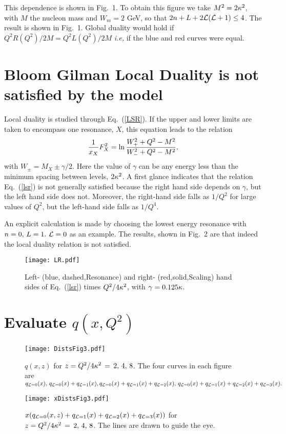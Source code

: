 \documentclass[aps,prd,amsmath,longbibliography]{revtex4-1}
\newcommand{\eq}[1]{Eq.~(\ref{#1})}
\def\bea{\begin{eqnarray}}
\def\eea{\end{eqnarray}}\def\a{\alpha}\newcommand{\bfk}{{\bf k}}\newcommand{\bfq}{{\bf q}}
\def\g{\gamma}\def\m{\mu}\def\t{\tau}\def\ve{\varepsilon}\def\l{\lambda}\def\s{\sigma}\def\n{\nu}\def\o{\omega}
\begin{document}
{ This dependence is shown in Fig.~1. To obtain this figure we take $M^2=2\kappa^2$, with $M$ the nucleon mass and $W_m =2$ GeV, so that $2n+L+ 2{\cal L}({\cal L}+1)\le4$. The result is shown in Fig.~1. Global duality would hold if $Q^2R(Q^2)/2M=Q^2L(Q^2)/2M$ {\it i.e,} if the blue and red curves were equal.
\section{Bloom Gilman Local Duality is not satisfied by the model}
Local duality is studied through \eq{LSR}. If the upper and lower limits are taken to encompass one resonance, $X$, this equation leads to the relation
\bea {1\over  x_X}F^2_{X}=\ln{W_+^2+Q^2-M^2\over W_-^2+Q^2-M^2},\label{lsr}\eea
with $W_\pm= M_X\pm  \g/2$. Here the value of $\g$ can be any energy less than the minimum spacing between levels, $2\kappa^2$.
A first glance indicates that the relation \eq{lsr} is not generally satisfied because the right hand side depends on $\g$, but the left hand side does not. Moreover, the right-hand side  falls as $1/Q^2$ for large values of $Q^2$, but the left-hand side falls as $1/Q^4$.

An explicit calculation is made by choosing  the lowest energy resonance with $n=0,\,L=1.\,\,{\cal L}=0$ as an example. The results, shown in Fig.~2 are that indeed the local duality relation is not satisfied.

   \begin{figure}[h] \label{duality2}

		\texttt{[image: LR.pdf]} 
     \caption{Left- (blue, dashed,Resonance) and right- (red,solid,Scaling)  hand sides of \eq{lsr} times $Q^2/4\kappa^2$, with $\g=0.125\k$.} \end{figure}  

 \section{Evaluate $q(x,Q^2)$}
\begin{figure}[h] \label{duality3}

		\texttt{[image: DistsFig3.pdf]} 
     \caption{$q(x,z)$ for $z=Q^2/4\kappa^2\,=\,2,\,4,\,8$. The    four curves in each figure are $q_{{\cal L}=0}(x),\, q_{{\cal L}=0}(x)+q_{{\cal L}=1}(x),
    q_{{\cal L}=0}(x)+q_{{\cal L}=1}(x)+q_{{\cal L}=2}(x) ,\,q_{{\cal L}=0}(x)+q_{{\cal L}=1}(x)+q_{{\cal L}=2}(x) +q_{{\cal L}=3}(x).$} \end{figure}  

\begin{figure}[h] \label{duality4}
		\texttt{[image: xDistsFig3.pdf]} 
     \caption{$x(q_{{\cal L}=0}(x,z)+q_{{\cal L}=1}(x)+q_{{\cal L}=2}(x) +q_{{\cal L}=3}(x))$ for $z=Q^2/4\kappa^2\,=\,2,\,4,\,8$. The lines are drawn to guide the eye.} \end{figure}  

}
\end{document}
